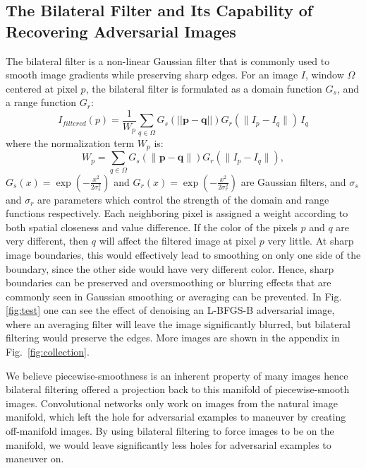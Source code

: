 \documentclass{article} %
\begin{document}
\subsection{The Bilateral Filter and Its Capability of Recovering Adversarial Images}
The bilateral filter is a non-linear Gaussian filter that is commonly used to smooth image gradients while preserving sharp edges. 
For an image $I$, window $\Omega$ centered at pixel $p$, the bilateral filter is formulated as a domain function $G_s$, and a range function $G_r$:
\[ 
I_{filtered}(p) = \frac{1}{W_p} \sum_{q \in \Omega} G_s(||\mathbf{p} - \mathbf{q}||) G_r(\|I_p - I_q\|)  \, I_q
\] 
where the normalization term $W_p$ is:
\[
W_p = \sum_{q \in \Omega} G_s(\|\mathbf{p} - \mathbf{q}\|) G_r(\|I_p - I_q\|),
\]
$G_s(x) = \exp(-\frac{x^2}{2 \sigma_s^2})$ and $G_r(x) = \exp(-\frac{x^2}{2 \sigma_r^2})$ are Gaussian filters,  and $\sigma_s$ and $\sigma_r$ are parameters which control the strength of the domain and range functions respectively.
Each neighboring pixel is assigned a weight according to both spatial closeness and value difference. %
If the color of the pixels $p$ and $q$ are very different, then $q$ will affect the filtered image at pixel $p$ very little. At sharp image boundaries, this would effectively lead to smoothing on only one side of the boundary, since the other side would have very different color. Hence, sharp boundaries can be preserved and oversmoothing or blurring effects that are commonly seen in Gaussian smoothing or averaging can be prevented. In Fig.\ref{fig:test} one can see the effect of denoising an L-BFGS-B adversarial image, where an averaging filter will leave the image significantly blurred, but bilateral filtering would preserve the edges. More images are shown in the appendix in Fig.~\ref{fig:collection}.

We believe piecewise-smoothness is an inherent property of many images hence bilateral filtering offered a projection back to this manifold of piecewise-smooth images. Convolutional networks only work on images from the natural image manifold, which left the hole for adversarial examples to maneuver by creating off-manifold images. By using bilateral filtering to force images to be on the manifold, we would leave significantly less holes for adversarial examples to maneuver on.
\end{document}
